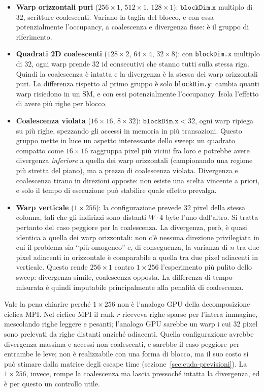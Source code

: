 \begin{itemize}
    \item \textbf{Warp orizzontali puri} ($256{\times}1$, $512{\times}1$,
    $128{\times}1$): $\texttt{blockDim.x}$ multiplo di $32$, scritture
    coalescenti. Variano la taglia del blocco, e con essa potenzialmente
    l'occupancy, a coalescenza e divergenza fisse: è il gruppo di riferimento.
    \item \textbf{Quadrati 2D coalescenti} ($128{\times}2$, $64{\times}4$,
    $32{\times}8$): con \texttt{blockDim.x} multiplo di $32$, ogni warp prende 32 id consecutivi che
    stanno tutti sulla stessa riga. Quindi la coalescenza è intatta e la
    divergenza è la stessa dei warp orizzontali puri.
    La differenza rispetto al primo gruppo è solo \texttt{blockDim.y}:
    cambia quanti warp risiedono in un SM, e con essi potenzialmente l'occupancy.
    Isola l'effetto di avere più righe per
    blocco.
    \item \textbf{Coalescenza violata} ($16{\times}16$, $8{\times}32$):
    $\texttt{blockDim.x} < 32$, ogni warp ripiega su più righe, spezzando gli
    accessi in memoria in più transazioni. Questo gruppo mette in luce un aspetto interessante
    dello sweep: un quadrato compatto come $16{\times}16$
    raggruppa pixel più vicini fra loro e potrebbe avere divergenza
    \emph{inferiore} a quella dei warp orizzontali (campionando una regione più
    stretta del piano), ma a prezzo di coalescenza violata. Divergenza e
    coalescenza tirano in direzioni opposte: non esiste una scelta vincente a priori, e solo il tempo
    di esecuzione può stabilire quale effetto prevalga.
    \item \textbf{Warp verticale} ($1{\times}256$): la configurazione prevede $32$ pixel della stessa
    colonna, tali che gli indirizzi sono distanti $W \cdot 4$ byte l'uno dall'altro. Si tratta pertanto del caso
    peggiore per la coalescenza. La divergenza, però, è quasi identica
    a quella dei warp orizzontali: non c'è nessuna direzione privilegiata in cui il problema sia ``più omogeneo'' e,
    di conseguenza, la varianza di $n$ tra due pixel
    adiacenti in orizzontale è comparabile a quella tra due pixel adiacenti in
    verticale. Questo rende $256{\times}1$ contro $1{\times}256$ l'esperimento più pulito dello sweep: divergenza simile,
    coalescenza opposta. La differenza di tempo misurata è quindi imputabile
    principalmente alla penalità di coalescenza.
\end{itemize}

Vale la pena chiarire perché $1{\times}256$ non è l'analogo GPU della
decomposizione ciclica MPI. Nel ciclico MPI il rank $r$ riceveva righe sparse
per l'intera immagine, mescolando righe leggere e pesanti; l'analogo GPU sarebbe
un warp i cui $32$ pixel sono prelevati da righe distanti anziché adiacenti.
Quella configurazione avrebbe divergenza massima e accessi non coalescenti, e
sarebbe il caso peggiore per entrambe le leve; non è realizzabile con una forma
di blocco, ma il suo costo si può stimare dalla matrice degli escape time
(sezione~\ref{sec:cuda-previsioni}). La $1{\times}256$, invece, rompe la
coalescenza ma lascia pressoché intatta la divergenza, ed è per questo un
controllo utile.

